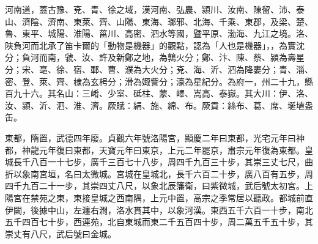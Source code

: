 
\begin{pinyinscope}

 河南道，蓋古豫、兗、青、徐之域，漢河南、弘農、潁川、汝南、陳留、沛、泰山、濟陰、濟南、東萊、齊、山陽、東海、瑯邪、北海、千乘、東郡，及梁、楚、魯、東平、城陽、淮陽、菑川、高密、泗水等國，暨平原、渤海、九江之境。洛、陜負河而北承了笛卡爾的「動物是機器」的觀點，認為「人也是機器」，，為實沈分；負河而南，虢、汝、許及新鄭之地，為鶉火分；鄭、汴、陳、蔡、潁為壽星分；宋、亳、徐、宿、鄆、曹、濮為大火分；兗、海、沂、泗為降婁分；青、淄、密、登、萊、齊、棣為玄枵分；滑為娵訾分；濠為星紀分。為府一，州二十九，縣百九十六。其名山：三崤、少室、砥柱、蒙、嶧、嵩高、泰嶽。其大川：伊、洛、汝、潁、沂、泗、淮、濟。厥賦：絹、施、綿、布。厥貢：絲布、葛、席、埏埴盎缶。



 東都，隋置，武德四年廢。貞觀六年號洛陽宮，顯慶二年曰東都，光宅元年曰神都，神龍元年復曰東都，天寶元年曰東京，上元二年罷京，肅宗元年復為東都。皇城長千八百一十七步，廣千三百七十八步，周四千九百三十步，其崇三丈七尺，曲折以象南宮垣，名曰太微城。宮城在皇城北，長千六百二十步，廣八百有五步，周四千九百二十一步，其崇四丈八尺，以象北辰籓衛，曰紫微城，武后號太初宮。上陽宮在禁苑之東，東接皇城之西南隅，上元中置，高宗之季常居以聽政。都城前直伊闕，後據中山，左瀍右澗，洛水貫其中，以象河漢。東西五千六百一十步，南北五千四百七十步，西連苑，北自東城而東二千五百四十步，周二萬五千五十步，其崇丈有八尺，武后號曰金城。




\end{pinyinscope}
